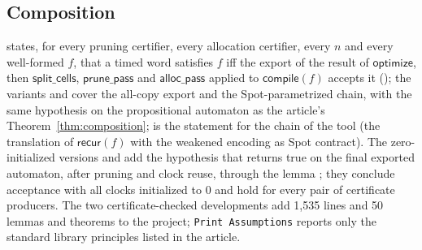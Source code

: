 \subsection{Composition}
 states, for every pruning certifier, every allocation certifier, every $n$ and every well-formed $f$, that a timed word satisfies $f$ iff the export of the result of $\mathsf{optimize}$, then $\mathsf{split\_cells}$, $\mathsf{prune\_pass}$ and $\mathsf{alloc\_pass}$ applied to $\mathsf{compile}(f)$ accepts it (); the variants  and  cover the all-copy export and the Spot-parametrized chain, with the same hypothesis on the propositional automaton as the article's Theorem~\ref{thm:composition};  is the statement for the chain of the tool (the translation of $\mathsf{recur}(f)$ with the weakened encoding as Spot contract). The zero-initialized versions  and  add the hypothesis that  returns true on the final exported automaton, after pruning and clock reuse, through the lemma ; they conclude acceptance with all clocks initialized to 0 and hold for every pair of certificate producers. The two certificate-checked developments add 1{,}535 lines and 50 lemmas and theorems to the project; \texttt{Print Assumptions} reports only the standard library principles listed in the article.

